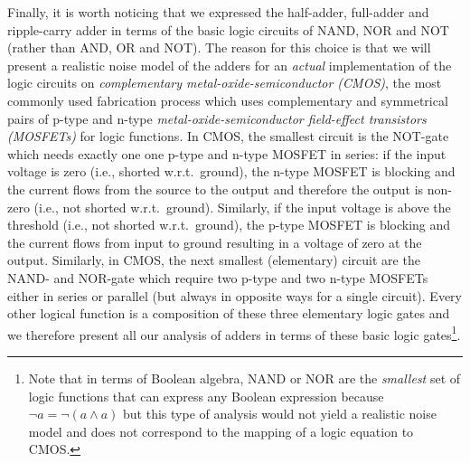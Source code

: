 Finally, it is worth noticing that we expressed the half-adder, full-adder and ripple-carry adder in terms of the basic logic circuits of NAND, NOR and NOT (rather than AND, OR and NOT). The reason for this choice is that we will present a realistic noise model of the adders for an {\em actual} implementation of the logic circuits on {\em complementary metal-oxide-semiconductor (CMOS)}, the most commonly used fabrication process which uses complementary and symmetrical pairs of p-type and n-type {\em metal-oxide-semiconductor field-effect transistors (MOSFETs)} for logic functions. In CMOS, the smallest circuit is the NOT-gate which needs exactly one one p-type and n-type MOSFET in series: if the input voltage is zero (i.e., shorted w.r.t.\ ground), the n-type MOSFET is blocking and the current flows from the source to the output and therefore the output is non-zero (i.e., not shorted w.r.t.\ ground). Similarly, if the input voltage is above the threshold (i.e., not shorted w.r.t.\ ground), the p-type MOSFET is blocking and the current flows from input to ground resulting in a voltage of zero at the output. Similarly, in CMOS, the next smallest (elementary) circuit are the NAND- and NOR-gate which require two p-type and two n-type MOSFETs either in series or parallel (but always in opposite ways for a single circuit). Every other logical function is a composition of these three elementary logic gates and we therefore present all our analysis of adders in terms of these basic logic gates\footnote{Note that in terms of Boolean algebra, NAND or NOR are the {\em smallest} set of logic functions that can express any Boolean expression because $\neg a = \neg(a \land a)$ but this type of analysis would not yield a realistic noise model and does not correspond to the mapping of a logic equation to CMOS.}.
